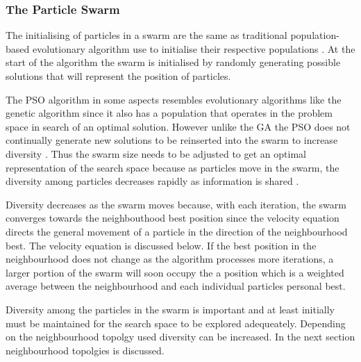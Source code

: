 \subsubsection{The Particle Swarm}
The initialising of particles in a swarm are the same as traditional population-based evolutionary algorithm use to initialise their respective populations \cite{FixedFAPPSO}.  At the start of the algorithm the swarm is initialised by randomly generating possible solutions that will represent the position of particles\cite{CompuIntelligenceIntro}. 

The \gls{PSO} algorithm in some aspects resembles evolutionary algorithms like the genetic algorithm since it also has a population that operates in the problem space in search of an optimal solution. However unlike the \gls{GA} the \gls{PSO} does not continually generate new solutions to be reinserted into the swarm to increase diversity \cite{PSOHybridUnitCommit}. Thus the swarm size needs to be adjusted to get an optimal representation of the search space because as particles move in the swarm, the diversity among particles decreases rapidly as information is shared \cite{FundamentalSwarm,CompuIntelligenceIntro}. 

Diversity decreases as the swarm moves because, with each iteration, the swarm converges towards the neighbouthood best position\cite{PSOHybridJobShop,CompuIntelligenceIntro,FundamentalSwarm} since the velocity equation directs the general movement of a particle in the direction of the neighbourhood best\cite{PSOHybridJobShop,CompuIntelligenceIntro,FundamentalSwarm}. The velocity equation is discussed below\cite{PSOHybridJobShop,CompuIntelligenceIntro,FundamentalSwarm}. If the best position in the neighbourhood does not change as the algorithm processes more iterations, a larger portion of the swarm will soon occupy the a position which is a weighted average between the neighbourhood and each individual particles personal best\cite{PSOHybridJobShop,CompuIntelligenceIntro,FundamentalSwarm}.

Diversity among the particles in the swarm is important and at least initially must be maintained for the search space to be explored adequeately. Depending on the neighbourhood topolgy used diversity can be increased. In the next section neighbourhood topolgies is discussed.
